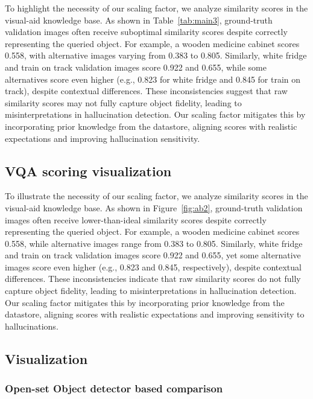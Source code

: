 To highlight the necessity of our scaling factor, we analyze similarity scores in the visual-aid knowledge base. As shown in Table~\ref{tab:main3}, ground-truth validation images often receive suboptimal similarity scores despite correctly representing the queried object. For example, a wooden medicine cabinet scores 0.558, with alternative images varying from 0.383 to 0.805. Similarly, white fridge and train on track validation images score 0.922 and 0.655, while some alternatives score even higher (e.g., 0.823 for white fridge and 0.845 for train on track), despite contextual differences. These inconsistencies suggest that raw similarity scores may not fully capture object fidelity, leading to misinterpretations in hallucination detection. Our scaling factor mitigates this by incorporating prior knowledge from the datastore, aligning scores with realistic expectations and improving hallucination sensitivity.

\subsection{VQA scoring visualization }

To illustrate the necessity of our scaling factor, we analyze similarity scores in the visual-aid knowledge base. As shown in Figure~\ref{fig:ab2}, ground-truth validation images often receive lower-than-ideal similarity scores despite correctly representing the queried object. For example, a wooden medicine cabinet scores 0.558, while alternative images range from 0.383 to 0.805. Similarly, white fridge and train on track validation images score 0.922 and 0.655, yet some alternative images score even higher (e.g., 0.823 and 0.845, respectively), despite contextual differences. These inconsistencies indicate that raw similarity scores do not fully capture object fidelity, leading to misinterpretations in hallucination detection. Our scaling factor mitigates this by incorporating prior knowledge from the datastore, aligning scores with realistic expectations and improving sensitivity to hallucinations.



\subsection{Visualization}

\subsubsection{Open-set Object detector based comparison}

